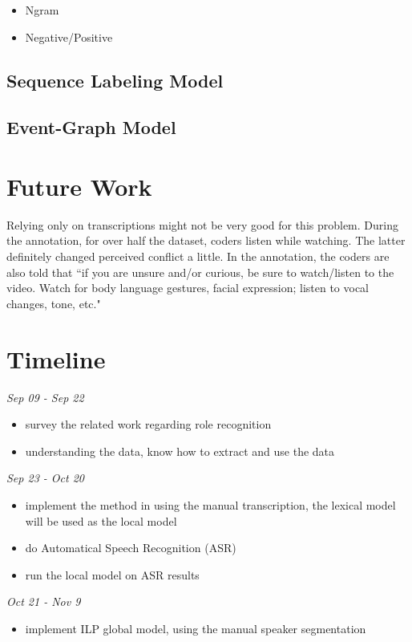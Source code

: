 \documentclass[11pt,letterpaper]{article}
\begin{document}
\begin{itemize}
	\item Ngram
	\item Negative/Positive
\end{itemize}

\subsection{Sequence Labeling Model}

\subsection{Event-Graph Model}

\section{Future Work}
Relying only on transcriptions might not be very good for this problem. During the annotation, for over half the dataset, coders listen while watching. The latter definitely changed perceived conflict a little. In the annotation, the coders are also told that ``if you are unsure and/or curious, be sure to watch/listen to the video. Watch for body language gestures, facial expression; listen to vocal changes, tone, etc."

\section{Timeline}

\noindent \emph{Sep 09 - Sep 22}
\begin{itemize}
  \item survey the related work regarding role recognition
  \item understanding the data, know how to extract and use the data
\end{itemize}

\noindent \emph{Sep 23 -  Oct 20}
\begin{itemize}
  \item implement the method in using the manual transcription, the lexical model will be used as the local model
  \item do Automatical Speech Recognition (ASR)
  \item run the local model on ASR results
\end{itemize}

\noindent \emph{Oct 21 - Nov 9}
\begin{itemize}
  \item implement ILP global model, using the manual speaker segmentation
\end{itemize}
\end{document}
